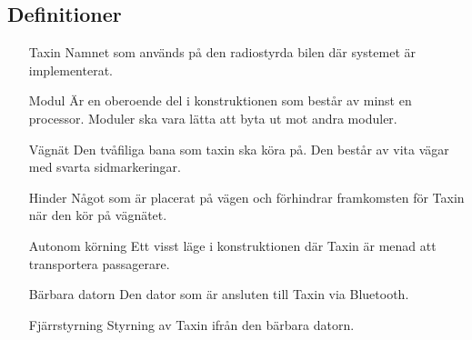 \documentclass[krav.tex]{subfiles}
\begin{document}
\subsection{Definitioner}
\begin{itemize}
    \item[Taxin] Namnet som används på den radiostyrda bilen där systemet är
    implementerat.
    \item[Modul] Är en oberoende del i konstruktionen som består av minst en
    processor. Moduler ska vara lätta att byta ut mot andra moduler.
    \item[Vägnät] Den tvåfiliga bana som taxin ska köra på. Den består av vita
    vägar med svarta sidmarkeringar.
    \item[Hinder] Något som är placerat på vägen och förhindrar framkomsten för
    Taxin när den kör på vägnätet.
    \item[Autonom körning] Ett visst läge i konstruktionen där Taxin är menad
    att transportera passagerare.
    \item[Bärbara datorn] Den dator som är ansluten till Taxin via Bluetooth.
    \item[Fjärrstyrning] Styrning av Taxin ifrån den bärbara datorn. 
\end{itemize}
\end{document}
